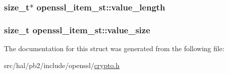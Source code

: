 \subsubsection[{\texorpdfstring{value\+\_\+length}{value_length}}]{\setlength{\rightskip}{0pt plus 5cm}size\+\_\+t$\ast$ openssl\+\_\+item\+\_\+st\+::value\+\_\+length}\hypertarget{structopenssl__item__st_a1df8749d942642c9a3d867bd574d647a}{}\label{structopenssl__item__st_a1df8749d942642c9a3d867bd574d647a}
\subsubsection[{\texorpdfstring{value\+\_\+size}{value_size}}]{\setlength{\rightskip}{0pt plus 5cm}size\+\_\+t openssl\+\_\+item\+\_\+st\+::value\+\_\+size}\hypertarget{structopenssl__item__st_ab073a992ed1a5ba36d5e8627ca42e93d}{}\label{structopenssl__item__st_ab073a992ed1a5ba36d5e8627ca42e93d}


The documentation for this struct was generated from the following file\+:\begin{DoxyCompactItemize}
\item 
src/hal/pb2/include/openssl/\hyperlink{crypto_8h}{crypto.\+h}\end{DoxyCompactItemize}
